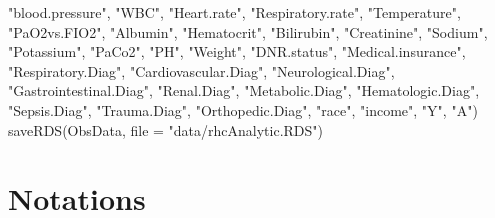 \documentclass[
]{book}
\newenvironment{Shaded}{\begin{snugshade}}{\end{snugshade}}
\newcommand{\AttributeTok}[1]{\textcolor[rgb]{0.77,0.63,0.00}{#1}}
\newcommand{\FunctionTok}[1]{\textcolor[rgb]{0.00,0.00,0.00}{#1}}
\newcommand{\NormalTok}[1]{#1}
\newcommand{\StringTok}[1]{\textcolor[rgb]{0.31,0.60,0.02}{#1}}
\begin{document}
\begin{Shaded}
\begin{Highlighting}[]
                    \StringTok{"blood.pressure"}\NormalTok{, }\StringTok{"WBC"}\NormalTok{, }\StringTok{"Heart.rate"}\NormalTok{, }\StringTok{"Respiratory.rate"}\NormalTok{, }
                    \StringTok{"Temperature"}\NormalTok{, }\StringTok{"PaO2vs.FIO2"}\NormalTok{, }\StringTok{"Albumin"}\NormalTok{, }\StringTok{"Hematocrit"}\NormalTok{, }
                    \StringTok{"Bilirubin"}\NormalTok{, }\StringTok{"Creatinine"}\NormalTok{, }\StringTok{"Sodium"}\NormalTok{, }\StringTok{"Potassium"}\NormalTok{, }\StringTok{"PaCo2"}\NormalTok{, }
                    \StringTok{"PH"}\NormalTok{, }\StringTok{"Weight"}\NormalTok{, }\StringTok{"DNR.status"}\NormalTok{, }\StringTok{"Medical.insurance"}\NormalTok{, }
                    \StringTok{"Respiratory.Diag"}\NormalTok{, }\StringTok{"Cardiovascular.Diag"}\NormalTok{, }
                    \StringTok{"Neurological.Diag"}\NormalTok{, }\StringTok{"Gastrointestinal.Diag"}\NormalTok{, }\StringTok{"Renal.Diag"}\NormalTok{,}
                    \StringTok{"Metabolic.Diag"}\NormalTok{, }\StringTok{"Hematologic.Diag"}\NormalTok{, }\StringTok{"Sepsis.Diag"}\NormalTok{, }
                    \StringTok{"Trauma.Diag"}\NormalTok{, }\StringTok{"Orthopedic.Diag"}\NormalTok{, }\StringTok{"race"}\NormalTok{, }\StringTok{"income"}\NormalTok{, }
                    \StringTok{"Y"}\NormalTok{, }\StringTok{"A"}\NormalTok{)}
\FunctionTok{saveRDS}\NormalTok{(ObsData, }\AttributeTok{file =} \StringTok{"data/rhcAnalytic.RDS"}\NormalTok{)}
\end{Highlighting}
\end{Shaded}

\hypertarget{notations}{%
\section{Notations}\label{notations}}
\end{document}
